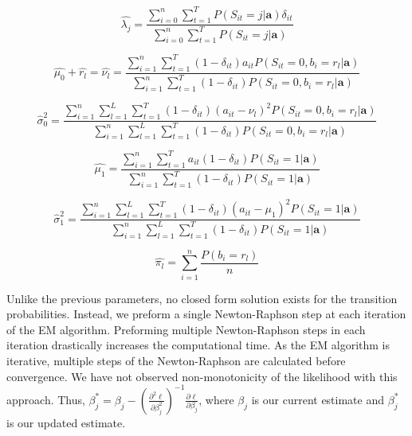 \documentclass{article}
\begin{document}
\begin{equation}\label{binom}
    \hat{\lambda_j}  = \frac{\sum^n_{i=0} \sum_{t=1}^T P(S_{it}=j|\textbf{a})\delta_{it}}
                            {\sum^n_{i=0} \sum_{t=1}^TP(S_{it}=j|\textbf{a})}
\end{equation} 

\begin{equation}\label{mu0}
    \hat{\mu_0} + \hat{r_l} = \hat{\nu_l} = 
    \frac{\sum_{i=1}^n \sum_{t=1}^T (1-\delta_{it})a_{it}P(S_{it}=0,b_{i}=r_l|\textbf{a})}
    {\sum_{i=1}^n \sum_{t=1}^T (1-\delta_{it})P(S_{it}=0,b_{i}=r_l|\textbf{a})}
\end{equation} 

\begin{equation}\label{sig0}
    \hat{\sigma}_0^2 = 
    \frac{\sum_{i=1}^n \sum_{l=1}^L \sum_{t=1}^T (1-\delta_{it})(a_{it}-\nu_l)^2 P(S_{it}=0,b_{i}=r_l|\textbf{a})}
        {\sum_{i=1}^n \sum_{l=1}^L \sum_{t=1}^T (1-\delta_{it}) P(S_{it}=0,b_{i}=r_l|\textbf{a})}
\end{equation} 

\begin{equation}\label{mu1}
    \hat{\mu_1} = 
    \frac{\sum_{i=1}^n \sum_{t=1}^T a_{it}(1-\delta_{it})P(S_{it}=1|\textbf{a})}
        {\sum_{i=1}^n \sum_{t=1}^T (1-\delta_{it})P(S_{it}=1|\textbf{a})}
\end{equation} 

\begin{equation}\label{sig1}
    \hat{\sigma}_1^2 = 
    \frac{\sum_{i=1}^n \sum_{l=1}^L \sum_{t=1}^T (1-\delta_{it})(a_{it}-\mu_1)^2 P(S_{it}=1|\textbf{a})}
        {\sum_{i=1}^n \sum_{l=1}^L \sum_{t=1}^T (1-\delta_{it}) P(S_{it}=1|\textbf{a})}
\end{equation} 

\begin{equation}\label{pi}
    \hat{\pi_l} = \sum_{i = 1}^n \frac{P(b_i = r_l)}{n}
\end{equation}


Unlike the previous parameters, no closed form solution exists for the transition probabilities. Instead, we preform a single Newton-Raphson step at each iteration of the EM algorithm. Preforming multiple Newton-Raphson steps in each iteration drastically increases the computational time. As the EM algorithm is iterative, multiple steps of the Newton-Raphson are calculated before convergence. We have not observed non-monotonicity of the likelihood with this approach. Thus, $\beta_{j}^* = \beta_{j} - (\frac{\partial^2\ell}{\partial \beta_{j}^2})^{-1} \frac{\partial\ell}{\partial \beta_{j}}$, where $\beta_{j}$ is our current estimate and $\beta_{j}^*$ is our updated estimate. 
\end{document}
